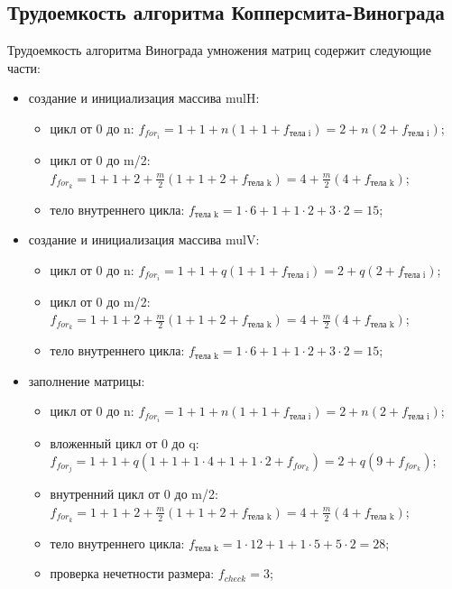 \documentclass[12pt]{report}
\begin{document}
    \subsection{Трудоемкость алгоритма Копперсмита-Винограда}
    Трудоемкость алгоритма Винограда умножения матриц содержит следующие части:
    \begin{itemize}
        \item создание и инициализация массива mulH:
        \begin{itemize}
            \item цикл от 0 до n: $f_{for_i}=1 + 1 + n(1 + 1 + f_{\text{тела i}}) = 2 + n(2 + f_{\text{тела i}})$;
            \item цикл от 0 до m/2: $f_{for_k}=1 + 1 + 2 + \frac{m}{2}(1 + 1 + 2 + f_{\text{тела k}}) = 4 + \frac{m}{2}(4 + f_{\text{тела k}})$;
            \item тело внутреннего цикла: $f_{\text{тела k}} = 1 \cdot 6 + 1 + 1\cdot2 + 3 \cdot 2 = 15$;
        \end{itemize}
        \item создание и инициализация массива mulV:
        \begin{itemize}
            \item цикл от 0 до n: $f_{for_i}=1 + 1 + q(1 + 1 + f_{\text{тела i}}) = 2 + q(2 + f_{\text{тела i}})$;
            \item цикл от 0 до m/2: $f_{for_k}=1 + 1 + 2 + \frac{m}{2}(1 + 1 + 2 + f_{\text{тела k}}) = 4 + \frac{m}{2}(4 + f_{\text{тела k}})$;
            \item тело внутреннего цикла: $f_{\text{тела k}} = 1 \cdot 6 + 1 + 1\cdot2 + 3 \cdot 2 = 15$;
        \end{itemize}
        \item заполнение матрицы:
        \begin{itemize}
            \item цикл от 0 до n: $f_{for_i}=1 + 1 + n(1 + 1 + f_{\text{тела i}}) = 2 + n(2 + f_{\text{тела i}})$;
            \item вложенный цикл от 0 до q: $f_{for_j}=1 + 1 +q(1 + 1 + 1 \cdot 4 + 1 + 1 \cdot 2 + f_{for_k}) = 2 + q(9 + f_{for_k})$;
            \item внутренний цикл от 0 до m/2: $f_{for_k}=1 + 1 + 2 + \frac{m}{2}(1 + 1 + 2 + f_{\text{тела k}}) = 4 + \frac{m}{2}(4 + f_{\text{тела k}})$;
            \item тело внутреннего цикла: $f_{\text{тела k}} = 1 \cdot 12 + 1 + 1 \cdot 5 + 5 \cdot 2 = 28$;
            \item проверка нечетности размера: $f_{check} = 3$;

\end{itemize}
\end{itemize}
\end{document}
